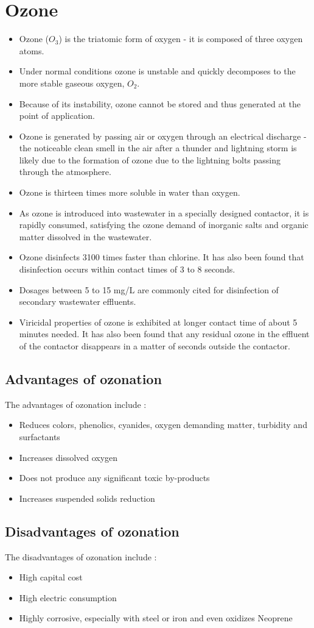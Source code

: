 \section{Ozone}
		\begin{itemize}
			\item Ozone ($O_3$) is the triatomic form of oxygen - it is composed of three oxygen atoms.
			\item Under normal conditions ozone is unstable and quickly decomposes to the more stable gaseous oxygen, $O_2$. 
			\item Because of its instability, ozone cannot be stored and thus generated at the point of application. 
			\item Ozone is generated by passing air or oxygen through an electrical discharge - the noticeable clean smell in the air after a thunder and lightning storm is likely due to the formation of ozone due to the lightning bolts passing through the atmosphere.
			\item Ozone is thirteen times more soluble in water than oxygen. 
			\item As ozone is introduced into wastewater in a specially designed contactor, it is rapidly consumed, satisfying the ozone demand of inorganic salts and organic matter dissolved in the wastewater.
			\item Ozone disinfects 3100 times faster than chlorine. It has also been found that disinfection occurs within contact times of 3 to 8 seconds.
			\item Dosages between 5 to 15 mg/L are commonly cited for disinfection of secondary wastewater effluents. 
			\item Viricidal properties of ozone is exhibited at longer contact time of about 5 minutes needed. It has also been found that any residual ozone in the effluent of the contactor disappears in a matter of seconds outside the contactor.
		\end{itemize}

\subsection{Advantages of ozonation}
	The advantages of ozonation include :
		\begin{itemize}
			\item Reduces colors, phenolics, cyanides, oxygen demanding matter, turbidity and surfactants
			\item Increases dissolved oxygen
			\item Does not produce any significant toxic by-products
			\item Increases suspended solids reduction
		\end{itemize}

\subsection{Disadvantages of ozonation}
	The disadvantages of ozonation include :
		\begin{itemize}
			\item High capital cost
			\item High electric consumption
			\item Highly corrosive, especially with steel or iron and even oxidizes Neoprene
		\end{itemize}
